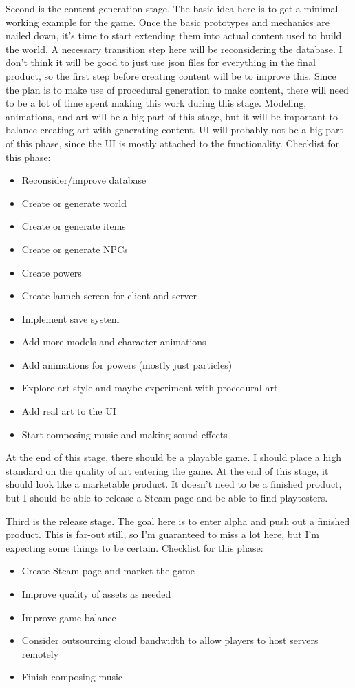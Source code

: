 \documentclass{article}
\begin{document}
Second is the content generation stage. The basic idea here is to get a minimal working
example for the game. Once the basic prototypes and mechanics are nailed down,
it's time to start extending them into actual content used to build the world.
A necessary transition step here will be reconsidering the database. I don't think
it will be good to just use json files for everything in the final product, so the first
step before creating content will be to improve this. Since the plan is to make use of procedural
generation to make content, there will need to be a lot of time spent making this work during
this stage. Modeling, animations, and art will be a big part of this stage, but it will be
important to balance creating art with generating content. UI will probably not be a big
part of this phase, since the UI is mostly attached to the functionality.
Checklist for this phase:
\begin{itemize}
    \item Reconsider/improve database
    \item Create or generate world
    \item Create or generate items
    \item Create or generate NPCs
    \item Create powers
    \item Create launch screen for client and server
    \item Implement save system
    \item Add more models and character animations
    \item Add animations for powers (mostly just particles)
    \item Explore art style and maybe experiment with procedural art
    \item Add real art to the UI
    \item Start composing music and making sound effects
\end{itemize}
At the end of this stage, there should be a playable game.
I should place a high standard on the quality of art entering the game. At the end of this stage,
it should look like a marketable product. It doesn't need to be a finished product, but I should
be able to release a Steam page and be able to find playtesters.

Third is the release stage. The goal here is to enter alpha and push out a finished product.
This is far-out still, so I'm guaranteed to miss a lot here, but I'm expecting some things to
be certain.
Checklist for this phase:
\begin{itemize}
    \item Create Steam page and market the game
    \item Improve quality of assets as needed
    \item Improve game balance
    \item Consider outsourcing cloud bandwidth to allow players to host servers remotely
    \item Finish composing music
\end{itemize}
\end{document}
